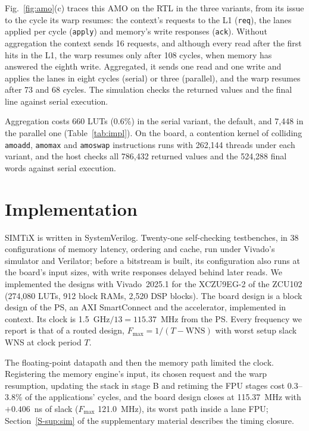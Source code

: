 \documentclass[journal]{IEEEtran}
\newcommand{\Fmax}{$F_{\max}$}
\begin{document}
Fig.~\ref{fig:amo}(c) traces this AMO on the RTL in the three variants, from its issue
to the cycle its warp resumes: the context's requests to the L1 (\texttt{req}), the
lanes applied per cycle (\texttt{apply}) and memory's write responses (\texttt{ack}).
Without aggregation the context sends 16 requests, and although every read after the
first hits in the L1, the warp resumes only after 108 cycles, when memory has answered
the eighth write. Aggregated, it sends one read and one write and applies the lanes in
eight cycles (serial) or three (parallel), and the warp resumes after 73 and 68 cycles.
The simulation checks the returned values and the final line against serial execution.

Aggregation costs 660 LUTs (0.6\%) in the serial variant, the default, and 7,448 in
the parallel one (Table~\ref{tab:impl}). On the board, a contention kernel of
colliding \texttt{amoadd}, \texttt{amomax} and \texttt{amoswap} instructions runs with
262,144 threads under each variant, and the host checks all 786,432 returned values
and the 524,288 final words against serial execution.

\section{Implementation}\label{sec:impl}
SIMTiX is written in SystemVerilog. Twenty-one self-checking testbenches, in 38
configurations of memory latency, ordering and cache, run under Vivado's simulator and
Verilator; before a bitstream is built, its configuration also runs at the board's
input sizes, with write responses delayed behind later reads. We implemented the
designs with Vivado~2025.1 for the XCZU9EG-2 of the ZCU102 (274,080 LUTs, 912 block
RAMs, 2,520 DSP blocks). The board design is a block design of the PS, an AXI
SmartConnect and the accelerator, implemented in context. Its clock is
1.5~GHz$/13=115.37$~MHz from the PS. Every frequency we report is that of a routed
design, \Fmax${}=1/(T-\mathrm{WNS})$ with worst setup slack WNS at clock period $T$.

The floating-point datapath and then the memory path limited the clock. Registering
the memory engine's input, its chosen request and the warp resumption, updating the
stack in stage B and retiming the FPU stages cost 0.3--3.8\% of the applications'
cycles, and the board design closes at 115.37~MHz with $+0.406$~ns of slack (\Fmax
121.0~MHz), its worst path inside a lane FPU; Section~\ref{S-sup:sim} of the
supplementary material describes the timing closure.
\end{document}
